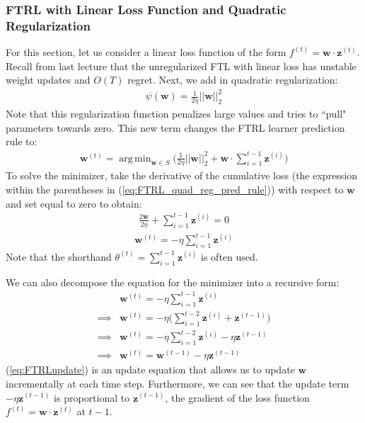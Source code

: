 \documentclass[11pt]{article}
\DeclareMathOperator*{\argmin}{arg\,min}
\begin{document}
\subsubsection{FTRL with Linear Loss Function and Quadratic Regularization}
For this section, let us consider a linear loss function of the form $f^{(t)} = \boldsymbol{w} \cdot \boldsymbol{z}^{(t)}$. Recall from last lecture that the unregularized FTL with linear loss has unstable weight updates and $O(T)$ regret. Next, we add in quadratic regularization:
\begin{align}
    \psi(\boldsymbol{w}) = \frac{1}{2\eta}||\boldsymbol{w}||_2^2
\end{align}
Note that this regularization function penalizes large values and tries to ``pull" parameters towards zero. This new term changes the FTRL learner prediction rule to:
\begin{align}
    \boldsymbol{w}^{(t)} = \argmin_{\boldsymbol{w} \in S} \Big( \frac{1}{2\eta}||\boldsymbol{w}||^2_2 + \boldsymbol{w} \cdot \sum_{i=1}^{t-1} \boldsymbol{z}^{(i)} \Big)
    \label{eq:FTRL_quad_reg_pred_rule}
\end{align}
To solve the minimizer, take the derivative of the cumulative loss (the expression within the parentheses in (\ref{eq:FTRL_quad_reg_pred_rule})) with respect to $\boldsymbol{w}$ and set equal to zero to obtain:
\begin{align}
    \frac{2\boldsymbol{w}}{2\eta} + \sum_{i=1}^{t-1}\boldsymbol{z}^{(i)}=0
\end{align}
\begin{align}
    \boldsymbol{w}^{(t)} = -\eta \sum_{i=1}^{t-1}\boldsymbol{z}^{(i)}
\end{align}
Note that the shorthand $\theta^{(t)}=\sum_{i=1}^{t-1}\boldsymbol{z}^{(i)}$ is often used.

We can also decompose the equation for the minimizer into a recursive form:
\begin{align}
    &\boldsymbol{w}^{(t)} = -\eta \sum_{i=1}^{t-1}\boldsymbol{z}^{(i)} \\
    \implies &\boldsymbol{w}^{(t)} = -\eta \Big( \sum_{i=1}^{t-2}\boldsymbol{z}^{(i)}  + \boldsymbol{z}^{(t-1)} \Big) \\
    \implies &\boldsymbol{w}^{(t)} = -\eta \sum_{i=1}^{t-2}\boldsymbol{z}^{(i)} - \eta \boldsymbol{z}^{(t-1)} \\
    \implies &\boldsymbol{w}^{(t)} = \boldsymbol{w}^{(t-1)} -\eta \boldsymbol{z}^{(t-1)}
    \label{eq:FTRLupdate}
\end{align}
(\ref{eq:FTRLupdate}) is an update equation that allows us to update $\boldsymbol{w}$ incrementally at each time step. Furthermore, we can see that the update term $-\eta \boldsymbol{z}^{(t-1)}$ is proportional to $\boldsymbol{z}^{(t-1)}$, the gradient of the loss function $f^{(t)} = \boldsymbol{w} \cdot \boldsymbol{z}^{(t)}$ at $t-1$.
\end{document}
